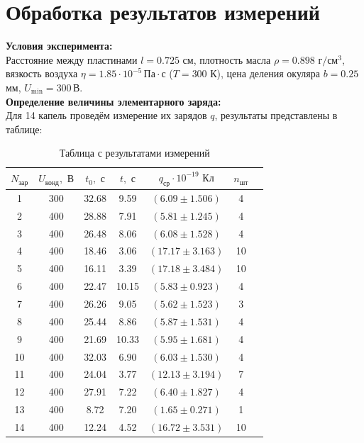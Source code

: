 \documentclass{lab}
\begin{document}
\section{Обработка результатов измерений}
\noindent
\textbf{Условия эксперимента:}
\\
Расстояние между пластинами $l = 0.725$ см, плотность масла $\rho = 0.898 \,\, \text{г}/\text{см}^3$, вязкость воздуха $\eta = 1.85 \cdot 10^{-5} \, \text{Па} \cdot \text{с}$ ($T = 300$ К), цена деления окуляра $b = 0.25$ мм, $U_\text{min} = 300 \, \text{В}$.
\\
\textbf{Определение величины элементарного заряда:}
\\
Для 14 капель проведём измерение их зарядов $q$, результаты представлены в таблице:
\begin{table}[H]
    \centering
    \begin{tabular}{|c|c|c|c|c|c|c|}
        \hline
        $N_\text{зар}$ & $U_\text{конд}, \text{ В}$ & $t_0, \text{ с}$ & $t, \text{ с}$ & $q_\text{ср} \cdot 10^{-19}\text{ Кл}$ & $n_\text{шт}$ \\
        \hline
        1 & 300 & 32.68 & 9.59  & $(6.09   \pm 1.506)$ & 4    \\
        2 & 400 & 28.88 & 7.91  & $(5.81   \pm 1.245)$ & 4    \\
        3 & 400 & 26.48 & 8.06  & $(6.08   \pm 1.528)$ & 4    \\
        4 & 400 & 18.46 & 3.06  & $(17.17  \pm 3.163)$ & 10   \\
        5 & 400 & 16.11 & 3.39  & $(17.18  \pm 3.484)$ & 10   \\
        6 & 400 & 22.47 & 10.15 & $(5.83  \pm 0.923)$ & 4    \\
        7 & 400 & 26.26 & 9.05  & $(5.62   \pm 1.523)$ & 3    \\
        8 & 400 & 25.44 & 8.86  & $(5.87   \pm 1.531)$ & 4    \\
        9 & 400 & 21.69 & 10.33 & $(5.95  \pm 1.681)$ & 4    \\
        10 & 400 & 32.03 & 6.90 & $(6.03  \pm 1.530)$ & 4    \\
        11 & 400 & 24.04 & 3.77 & $(12.13 \pm 3.194)$ & 7    \\
        12 & 400 & 27.91 & 7.22 & $(6.40  \pm 1.827)$ & 4    \\
        13 & 400 & 8.72 & 7.20  & $(1.65   \pm 0.271)$ & 1    \\
        14 & 400 & 12.24 & 4.52 & $(16.72 \pm 3.531)$ & 10   \\
        \hline
    \end{tabular}
    \caption{Таблица с результатами измерений}
\end{table}
\end{document}
